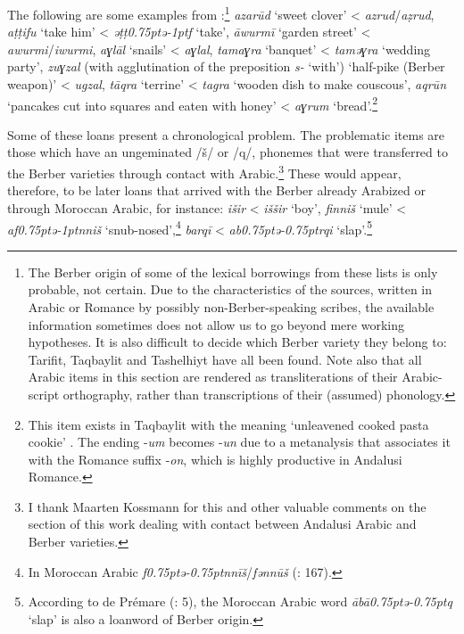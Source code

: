 \documentclass[output=paper,modfonts,nonflat]{langsci/langscibook}
\begin{document}
The following are some examples from \citet{CorrientePereiraVicente2017}:\footnote{The Berber origin of some of the lexical borrowings from these lists is only probable, not certain. Due to the characteristics of the sources, written in Arabic or Romance by possibly non-Berber-speaking scribes, the available information sometimes does not allow us to go beyond mere working hypotheses. It is also difficult to decide which Berber variety they belong to: Tarifit, Taqbaylit and Tashelhiyt have all been found. Note also that all Arabic items in this section are rendered as transliterations of their Arabic-script orthography, rather than transcriptions of their (assumed) phonology.} \textit{azarūd} ‘sweet clover’ < \textit{azrud}/\textit{aẓrud}, \textit{aṭṭifu} ‘take him’ < \textit{ǝṭṭ\kern 0.75ptǝ\kern -1ptf} ‘take’, \textit{āwurmī} ‘garden street’ < \textit{awurmi}/\textit{iwurmi}, \textit{aɣlāl} ‘snails’ < \textit{aɣlal}, \textit{tamaɣra} ‘banquet’ < \textit{tamǝɣra} `wedding party', \textit{zuɣzal} ({with agglutination of the preposition} \textit{s-} ‘with’) ‘half-pike (Berber weapon)’ < \textit{ugzal}, \textit{tāqra} `terrine' < \textit{tagra} `wooden dish to make couscous’, \textit{aqrūn} ‘pancakes cut into squares and eaten with honey’ < \textit{aɣrum} ‘bread’.\footnote{This item exists in Taqbaylit with the meaning ‘unleavened cooked pasta cookie’ \citep{Dallet1982}. The ending -\textit{um} becomes -\textit{un} due to a metanalysis that associates it with the Romance suffix -\textit{on}, which is highly productive in Andalusi Romance.} 

Some of these loans present a chronological problem. The problematic items are those which have an ungeminated /š/ or /q/, phonemes that were transferred to the Berber varieties through contact with Arabic.\footnote{I thank Maarten Kossmann for this and other valuable comments on the section of this work dealing with contact between Andalusi Arabic and Berber varieties.} These would appear, therefore, to be later loans that arrived with the Berber already Arabized or through Moroccan Arabic, for instance: \textit{išir} < \textit{iššir} ‘boy’, \textit{finniš} ‘mule’ < \textit{af\kern 0.75ptǝ\kern -1ptnniš} ‘snub-nosed’,\footnote{In Moroccan Arabic \textit{f\kern 0.75ptǝ\kern -0.75ptnnīš}/\textit{fənnūš} (\citealt{Prémare1998}: 167).}  \textit{barqī} < \textit{ab\kern 0.75ptǝ\kern -0.75ptrqi} ‘slap’.\footnote{According to de Prémare (\citeyear{Prémare1993}: 5), the Moroccan Arabic word \textit{ābā{\R}\kern 0.75ptǝ\kern -0.75ptq} ‘slap’ is also a loanword of Berber origin.}
\end{document}
